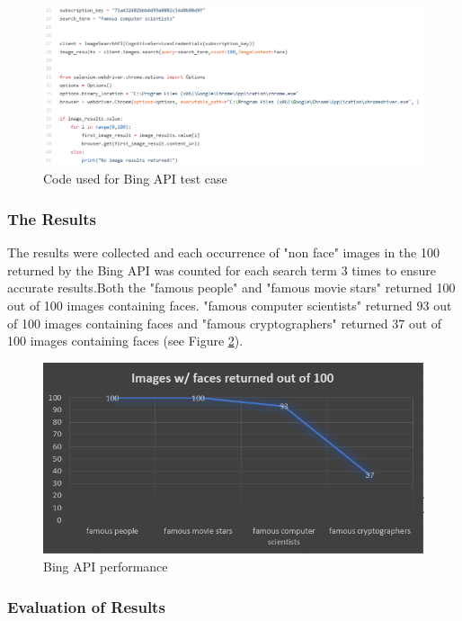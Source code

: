 \documentclass[12pt,a4paper]{article}
\begin{document}
\begin{figure}[!ht]
    \centering
    \includegraphics[width=1.0\textwidth]{Figs/bingevcode.PNG} 
    \caption{Code used for Bing API test case} 
    \label{bingevc}
\end{figure} 

\subsubsection{The Results} 

The results were collected and each occurrence of "non face"  images in the 100 returned by the Bing API was counted for each search term 3 times to ensure accurate results.Both the "famous people" and "famous movie stars" returned 100 out of 100 images containing faces. "famous computer scientists" returned 93 out of 100 images containing faces and "famous cryptographers" returned 37 out of 100 images containing faces (see Figure \ref{bingev}). 


\begin{figure}[!ht]
    \centering
    \includegraphics[width=1.0\textwidth]{Figs/bingev.PNG} 
    \caption{Bing API performance} 
    \label{bingev}
\end{figure}

\subsubsection{Evaluation of Results} 
\end{document}
